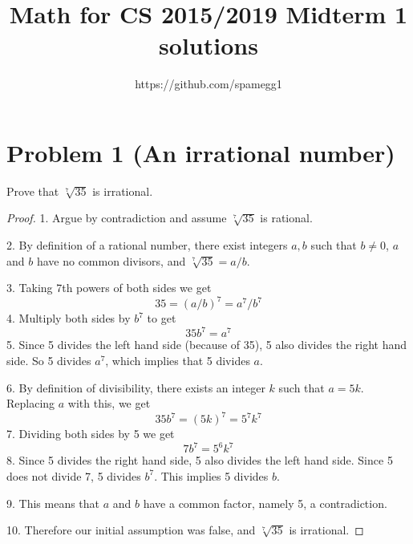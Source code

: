 \documentclass[14pt]{extarticle}
\title{Math for CS 2015/2019 Midterm 1 solutions}
\author{https://github.com/spamegg1}
\begin{document}
\maketitle
\tableofcontents

\section{Problem 1 (An irrational number)}
Prove that $\sqrt[7]{35}$ is irrational.
\begin{proof}
1. Argue by contradiction and assume $\sqrt[7]{35}$ is rational.

2. By definition of a rational number, there exist integers $a, b$ such that $b \neq 0$, $a$ and $b$ have no common divisors, and $\sqrt[7]{35} = a / b$.

3. Taking 7th powers of both sides we get
$$
35 = (a/b)^7 = a^7 / b^7
$$
4. Multiply both sides by $b^7$ to get
$$
35b^7 = a^7
$$
5. Since 5 divides the left hand side (because of 35), 5 also divides the right hand side. So 5 divides $a^7$, which implies that 5 divides $a$.

6. By definition of divisibility, there exists an integer $k$ such that $a = 5k$. Replacing $a$ with this, we get
$$
35b^7 = (5k)^7 = 5^7k^7
$$
7. Dividing both sides by 5 we get
$$
7b^7 = 5^6k^7
$$
8. Since 5 divides the right hand side, 5 also divides the left hand side. Since 5 does not divide 7, 5 divides $b^7$. This implies 5 divides $b$.

9. This means that $a$ and $b$ have a common factor, namely 5, a contradiction.

10. Therefore our initial assumption was false, and $\sqrt[7]{35}$ is irrational.
\end{proof}
\end{document}
